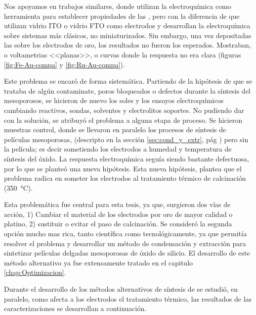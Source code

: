 {  		Nos apoyamos en trabajos similares\cite{Otal2006,Calvo2009b,Fattakhova-Rohlfing2007,Rohlfing2005}, donde utilizan la electroquímica como herramienta para establecer propiedades de las \pdm, pero con la diferencia de que utilizan vidrio ITO o vidrio FTO como electrodos y desarrollan la electroquímica sobre sistemas más clásicos, no miniaturizados. Sin embargo, una vez depositadas las \pdm\space sobre los electrodos de oro, los resultados no fueron los esperados.  Mostraban, o voltametrias <<planas>>, o curvas donde la respuesta no era clara (figuras \ref{fig:Fe-Au-compa} y \ref{fig:Ru-Au-compa}). 

  		Este problema se encaró de forma sistemática. Partiendo de la hipótesis de que se trataba de algún contaminate, poros bloqueados o defectos durante la síntesis del mesoporosos, se hicieron de nuevo los soles y los ensayos electroquímicos cambiando reactivos, sondas, solventes y electrolitos soportes. No pudiendo dar con la solución, se atribuyó el problema a alguna etapa de proceso. Se hicieron muestras control, donde se llevaron en paralelo los procesos de síntesis de películas mesoporosas, (descripto en la sección \ref{sec:cond_y_extr}, pág \pageref{sec:cond_y_extr}) pero sin la película; es decir sometiendo los electrodos a humedad y temperatura de síntesis del óxido. La respuesta electroquímica seguía siendo bastante defectuosa, por lo que se planteó una nueva hipótesis. Esta nueva hipótesis, plantea que el problema radica en someter los electrodos al tratamiento térmico de calcinación (\SI{350}{\celsius}).

  		Esta problemática fue central para esta tesis, ya que, surgieron dos vías de acción, 1) Cambiar el material de los electrodos por oro de mayor calidad o platino, 2) sustituir o evitar el paso de calcinación. Se consideró la segunda opción mucho mas rica, tanto científica como tecnológicamente, ya que permitía resolver el problema y desarrollar un método de condensación y extracción para sintetizar películas delgadas mesoporosas de óxido de silicio. El desarrollo de este método alternativo ya fue extensamente tratado en el capitulo \ref{chap:Optimizacion}.

  		Durante el desarrollo de los métodos alternativos de síntesis de \pdm\space se estudió, en paralelo, como afecta a los electrodos el tratamiento térmico, las resultados de las caracterizaciones se desarrollan a continuación.
			
}
